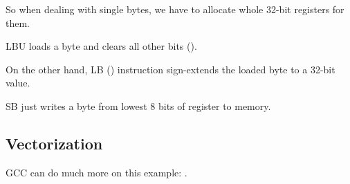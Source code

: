 So when dealing with single bytes, we have to allocate whole 32-bit registers for them.

LBU loads a byte and clears all other bits ().

On the other hand, LB () instruction sign-extends the loaded byte to a 32-bit value.

SB just writes a byte from lowest 8 bits of register to memory.

\fi

\subsection{Vectorization}

\Optimizing GCC can do much more on this example: 
.
